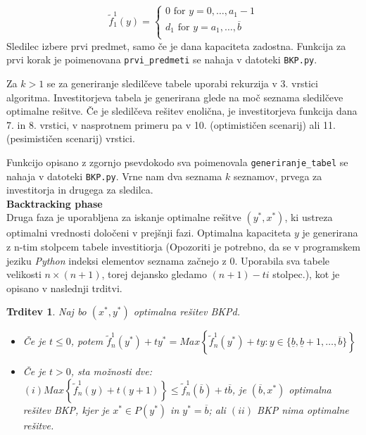 \documentclass[a4paper, 11pt]{article}
\newtheorem{theorem}{Trditev}
\begin{document}
	\[   
	\text{$\widetilde{f}^{1}_{1}(y) =$}
    	\begin{cases}
	 	\text{0 for $y = 0, \dots, a_1 - 1$} \\
       		\text{$d_1$ for $y = a_1, \dots, \overline{b}$} \\
    	\end{cases}
	\]
	Sledilec izbere prvi predmet, samo če je dana kapaciteta zadostna. Funkcija za prvi korak je poimenovana \texttt{prvi\_predmeti} se nahaja v datoteki \texttt{BKP.py}.
	
	Za $k > 1$ se za generiranje sledilčeve tabele uporabi rekurzija v 3. vrstici algoritma. Investitorjeva tabela je generirana glede na moč seznama sledilčeve optimalne rešitve. Če je sledilčeva rešitev enolična, je investitorjeva funkcija dana 7. in 8. vrstici, v nasprotnem primeru pa v 10. (optimističen scenarij) ali 11. (pesimističen scenarij) vrstici. 
	
	Funkcijo opisano z zgornjo psevdokodo sva poimenovala \texttt{generiranje\_tabel} se nahaja v datoteki \texttt{BKP.py}. Vrne nam dva seznama $k$ seznamov, prvega za investitorja in drugega za sledilca. \\
	
	\textbf{Backtracking phase} \\
	Druga faza je uporabljena za iskanje optimalne rešitve $(y^*, x^*)$, ki ustreza optimalni vrednosti določeni v prejšnji fazi. Optimalna kapaciteta $y$ je generirana z n-tim stolpcem tabele investitiorja (Opozoriti je potrebno, da se v programskem jeziku \textit{Python} indeksi elementov seznama začnejo z 0. Uporabila sva tabele velikosti $n \times (n+1)$, torej dejansko gledamo $(n+1)-ti$ stolpec.), kot je opisano v naslednji trditvi.
	
	\begin{theorem}
	Naj bo $(x^*, y^*)$ optimalna rešitev BKPd.
	\begin{itemize}
		\item Če je $t \leq 0$, potem $\widetilde{f}^{1}_{n}(y^*) + ty^* = Max \left\{ \widetilde{f}^{1}_{n}(y^*) + ty : y \in \{\underline{b}, \underline{b} + 1, \dots, \overline{b} \} \right\}$
		\item Če je $t > 0$, sta možnosti dve: $(i) Max \left\{ \widetilde{f}^{1}_{n}(y) + t(y + 1) \right\} \leq \widetilde{f}^{1}_{n}(\overline{b}) + t\overline{b}$, je $( \overline{b}, x^* )$ optimalna rešitev BKP, kjer je $x^* \in P(y^*)$ in $y^* = \overline{b}$; ali $(ii)$ BKP nima optimalne rešitve.
	\end{itemize}
	\end{theorem}
	
\end{document}
